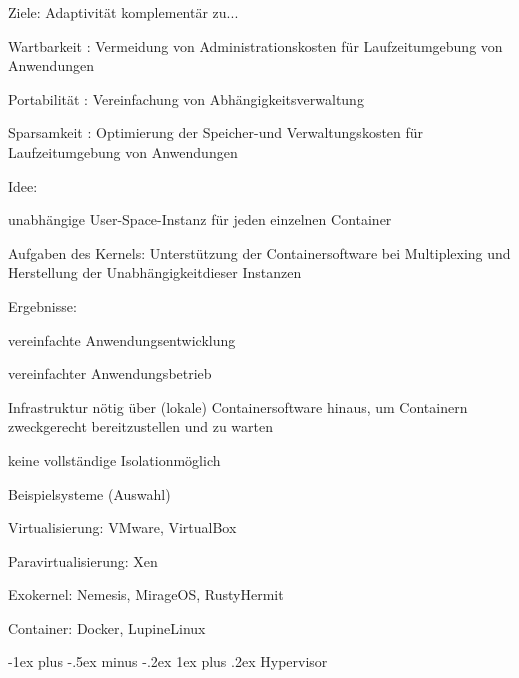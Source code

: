 \documentclass[a4paper]{article}
\makeatletter
\newcommand{\cmark}{\ding{51}}
\newcommand{\xmark}{\ding{55}}
\renewcommand{\subsubsection}{\@startsection{subsubsection}{3}{0mm}%
 {-1ex plus -.5ex minus -.2ex}%
 {1ex plus .2ex}%
 {\normalfont\small\bfseries}}
\makeatother
\begin{document}
\begin{multicols}{3}
    \begin{itemize*}
        \item Ziele: Adaptivität komplementär zu...
        \begin{itemize*}
            \item Wartbarkeit : Vermeidung von Administrationskosten für Laufzeitumgebung von Anwendungen
            \item Portabilität : Vereinfachung von Abhängigkeitsverwaltung
            \item Sparsamkeit : Optimierung der Speicher-und Verwaltungskosten für Laufzeitumgebung von Anwendungen
        \end{itemize*}
        \item Idee:
        \begin{itemize*}
            \item unabhängige User-Space-Instanz für jeden einzelnen Container
            \item Aufgaben des Kernels: Unterstützung der Containersoftware bei Multiplexing und Herstellung der Unabhängigkeitdieser Instanzen
        \end{itemize*}
        \item Ergebnisse:
        \begin{itemize*}
            \item[\cmark] vereinfachte Anwendungsentwicklung
            \item[\cmark] vereinfachter Anwendungsbetrieb
            \item[\xmark] Infrastruktur nötig über (lokale) Containersoftware hinaus, um Containern zweckgerecht bereitzustellen und zu warten
            \item[\xmark] keine vollständige Isolationmöglich
        \end{itemize*}
    \end{itemize*}

    Beispielsysteme (Auswahl)

    \begin{itemize*}
        \item Virtualisierung: VMware, VirtualBox
        \item Paravirtualisierung: Xen
        \item Exokernel: Nemesis, MirageOS, RustyHermit
        \item Container: Docker, LupineLinux
    \end{itemize*}


    \subsubsection{Hypervisor}



\end{multicols}
\end{document}
